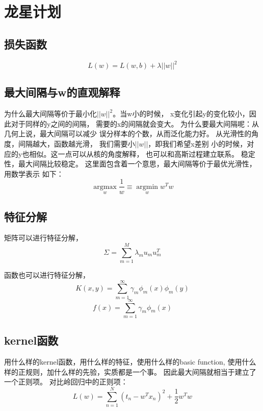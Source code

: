 \section{龙星计划}
\subsection{损失函数}
\begin{equation} 
L(w) = L(w, b) + \lambda||w||^2
\end{equation}

\subsection{最大间隔与w的直观解释}
为什么最大间隔等价于最小化$||w||^2$。当w小的时候，
x变化引起y的变化较小，因此对于同样的y之间的间隔，
需要的x的间隔就会变大。
为什么要最大间隔呢：从几何上说，最大间隔可以减少
误分样本的个数，从而泛化能力好。
从光滑性的角度，间隔越大，函数越光滑，
我们需要小$||w||$，即我们希望x差别
小的时候，对应的y也相似。这一点可以从核的角度解释，
也可以和高斯过程建立联系。
稳定性，最大间隔比较稳定。
这里面包含着一个意思，最大间隔等价于最优光滑性，用数学表示
如下：
\begin{equation}
\underset{w}{\operatorname{arg max}}\frac{1}{w}
\equiv \underset{w}{\operatorname{arg min}}w^Tw
\end{equation}

\subsection{特征分解}
矩阵可以进行特征分解，
\begin{equation} 
\Sigma = \sum_{m=1}^M\lambda_mu_mu^T_m
\end{equation}

函数也可以进行特征分解，
\begin{equation} 
K(x, y) = \sum_{m=1}^\infty\gamma_m\phi_m(x)\phi_m(y)
\end{equation}
\begin{equation} 
f(x) = \sum_{m=1}^\infty\gamma_m\phi_m(x)
\end{equation}

\subsection{kernel函数}
用什么样的kernel函数，用什么样的特征，使用什么样的basic function,
使用什么样的正规则，加什么样的先验，实质都是一个事。
因此最大间隔就相当于建立了一个正则项。
对比岭回归中的正则项：
\begin{equation}
L(w) = \sum_{n=1}^N(t_n - w^Tx_n)^2 + \frac{1}{2}w^Tw
\end{equation}

